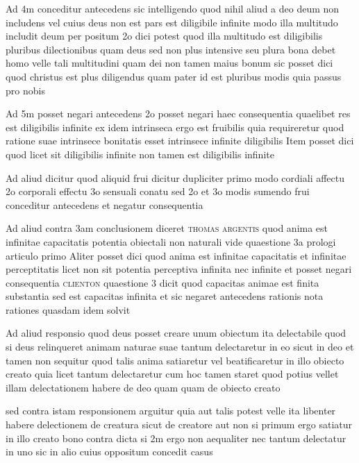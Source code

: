 \documentclass[twoside, openright]{article}
\newcommand{\name}[1]{\textsc{#1}}
\begin{document}
        \pstart
        Ad 4m conceditur antecedens sic intelligendo quod nihil aliud a deo deum non includens vel cuius deus non est pars est diligibile infinite modo illa multitudo includit deum per positum 2o dici potest quod illa multitudo est diligibilis pluribus dilectionibus quam deus sed non plus intensive seu plura bona debet homo velle tali multitudini quam dei non tamen maius bonum sic posset dici quod christus est plus diligendus quam pater id est pluribus modis quia passus pro nobis
        \pend
     
        \pstart
        Ad 5m posset negari antecedens 2o posset negari haec consequentia quaelibet res est diligibilis infinite ex idem intrinseca ergo est fruibilis quia requireretur quod ratione suae intrinsece bonitatis esset intrinsece infinite diligibilis Item posset dici quod licet sit diligibilis infinite non tamen est diligibilis infinite
        \pend
     
        \pstart
        Ad aliud dicitur quod aliquid frui dicitur dupliciter primo modo cordiali affectu 2o corporali effectu 3o sensuali conatu sed 2o et 3o modis sumendo frui conceditur antecedens et negatur consequentia
        \pend
     
        \pstart
        Ad aliud contra 3am conclusionem diceret \name{thomas argentis} quod anima est infinitae capacitatis potentia obiectali non naturali vide quaestione 3a prologi articulo primo  Aliter posset dici quod anima est infinitae capacitatis et infinitae perceptitatis licet non sit potentia perceptiva infinita nec infinite et posset negari consequentia \name{clienton}  quaestione 3 dicit quod capacitas animae est finita substantia sed est capacitas infinita et sic negaret antecedens rationis nota rationes quasdam idem solvit
        \pend
     
        \pstart
        Ad aliud responsio quod deus posset creare unum obiectum ita delectabile quod si deus relinqueret animam naturae suae tantum delectaretur in eo sicut in deo et tamen non sequitur quod talis anima satiaretur vel beatificaretur in illo obiecto creato quia licet tantum delectaretur cum hoc tamen staret quod potius vellet illam delectationem habere de deo quam quam de obiecto creato
        \pend
     
        \pstart
        sed contra istam responsionem arguitur quia aut talis potest velle ita libenter habere delectionem de creatura sicut de creatore aut non si primum ergo satiatur in illo creato bono contra dicta si 2m ergo non aequaliter nec tantum delectatur in uno sic in alio cuius oppositum concedit casus
        \pend
     
\end{document}

